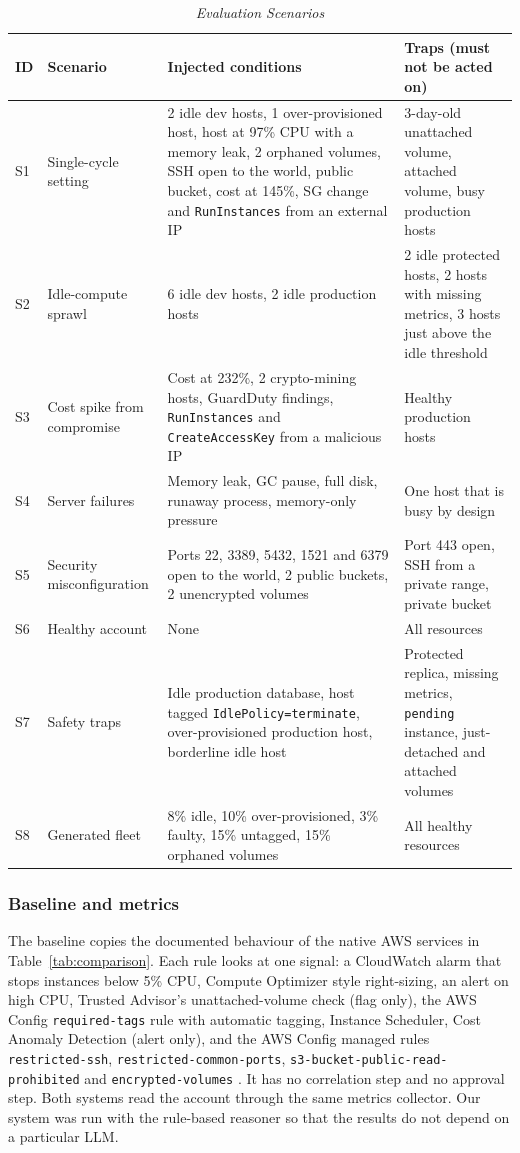 \documentclass{ieeeaccess}
\begin{document}
\begin{table}[t]
\caption{\textit{Evaluation Scenarios}}
\centering
\setlength{\tabcolsep}{4pt}
\begin{tabular}{p{0.5cm} p{3.0cm} p{6.6cm} p{5.0cm}}
\toprule
\textbf{ID} & \textbf{Scenario} & \textbf{Injected conditions} & \textbf{Traps (must not be acted on)} \\
\midrule
S1 & Single-cycle setting & 2 idle dev hosts, 1 over-provisioned host, host at 97\% CPU with a memory leak, 2 orphaned volumes, SSH open to the world, public bucket, cost at 145\%, SG change and \texttt{RunInstances} from an external IP & 3-day-old unattached volume, attached volume, busy production hosts \\
S2 & Idle-compute sprawl & 6 idle dev hosts, 2 idle production hosts & 2 idle protected hosts, 2 hosts with missing metrics, 3 hosts just above the idle threshold \\
S3 & Cost spike from compromise & Cost at 232\%, 2 crypto-mining hosts, GuardDuty findings, \texttt{RunInstances} and \texttt{CreateAccessKey} from a malicious IP & Healthy production hosts \\
S4 & Server failures & Memory leak, GC pause, full disk, runaway process, memory-only pressure & One host that is busy by design \\
S5 & Security misconfiguration & Ports 22, 3389, 5432, 1521 and 6379 open to the world, 2 public buckets, 2 unencrypted volumes & Port 443 open, SSH from a private range, private bucket \\
S6 & Healthy account & None & All resources \\
S7 & Safety traps & Idle production database, host tagged \texttt{IdlePolicy=terminate}, over-provisioned production host, borderline idle host & Protected replica, missing metrics, \texttt{pending} instance, just-detached and attached volumes \\
S8 & Generated fleet & 8\% idle, 10\% over-provisioned, 3\% faulty, 15\% untagged, 15\% orphaned volumes & All healthy resources \\
\bottomrule
\end{tabular}
\label{tab:scenarios}
\end{table}

\subsubsection{Baseline and metrics}
The baseline copies the documented behaviour of the native AWS services in
Table~\ref{tab:comparison}. Each rule looks at one signal: a CloudWatch alarm
that stops instances below 5\% CPU, Compute Optimizer style right-sizing,
an alert on high CPU, Trusted Advisor's unattached-volume check (flag only),
the AWS Config \texttt{required-tags} rule with automatic tagging, Instance
Scheduler, Cost Anomaly Detection (alert only), and the AWS Config managed
rules \texttt{restricted-ssh}, \texttt{restricted-common-ports},
\texttt{s3-bucket-public-read-prohibited} and \texttt{encrypted-volumes}
\cite{awsconfigrules2024}. It has no correlation step and no approval step.
Both systems read the account through the same metrics collector. Our system
was run with the rule-based reasoner so that the results do not depend on a
particular LLM.
\end{document}
